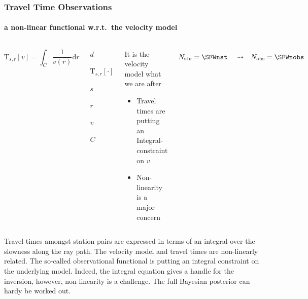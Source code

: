\documentclass[aspectratio=169, t, 10pt, ignorenonframetext]{beamer}
\begin{document}
\begin{frame}
    \frametitle{Travel Time Observations}
    \framesubtitle{a non-linear functional w.r.t.~the velocity model}

\begin{columns}
%
    \begin{equation}
        \mathrm T_{s,r}[v] = \int_C \frac 1{v(r)} \mathrm d r 
    \end{equation}

    \begin{description}[leftmargin=! ,labelwidth=1cm]
        \item [Measured value]           $d$
        \item [Observational functional] $\mathrm T_{s,r}[\cdot]$
        \item [Source location]          $s$
        \item [Receiver position]        $r$
        \item [Velocity model]           $v$
        \item [Ray path]                 $C$ 
    \end{description}

    \begin{alertblock}{It is the velocity model what we are after}
    \begin{itemize}
        \item Travel times are putting an Integral-constraint on $v$
        \item Non-linearity is a major concern
    \end{itemize}
    \end{alertblock}


    \vspace{-10mm}
    \only{}
    \small
    \begin{align}
        N_\text{stn} &= \SFWnst &
        & \leadsto &
        N_\text{obs} &= \SFWnobs
    \end{align}

\end{columns}

\end{frame}

Travel times amongst station pairs are expressed in terms of an integral over the slowness along the ray path. 
The velocity model and travel times are non-linearly related. 
The so-called observational functional is putting an integral constraint on the underlying model. 
Indeed, the integral equation gives a handle for the inversion, however, non-linearity is a challenge. 
The full Bayesian posterior can hardy be worked out. 
\end{document}
